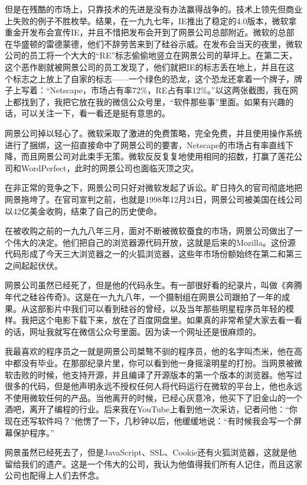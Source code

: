 \documentclass[
  letterpaper,
  DIV=11,
  numbers=noendperiod]{scrreprt}
\begin{document}
但是在残酷的市场上，只靠技术的先进是没有办法赢得战争的。技术上领先但商业上失败的例子不胜枚举。结果，在一九九七年，IE推出了稳定的4.0版本，微软拿重金开发布会宣传IE，并且不惜把发布会开到了网景公司总部附近。微软的总部在华盛顿的雷德蒙德，他们不辞劳苦来到了硅谷示威。在发布会当天的夜里，微软公司的员工将一个大大的``RE''标志偷偷地竖立在网景公司的草坪上。在第二天，这个恶作剧就被网景公司的员工发现了，他们就把IE的标志丢在地上，并且在这个标志之上放上了自家的标志------一个绿色的恐龙，这个恐龙还拿着一个牌子，牌子上写着：``Netscape，市场占有率72\%，RE占有率12\%。''以这两张截图，我在网上都找到了，我把它放在我的微信公众号里，``软件那些事''里面。如果有兴趣的话，可以关注一下，看一看还是挺有意思的。

网景公司掉以轻心了。微软采取了激进的免费策略，完全免费，并且使用操作系统进行了捆绑，这一招直接命中了网景公司的要害，Netscape的市场占有率直线下降，而且网景公司对此束手无策。微软反反复复地使用相同的招数，打赢了莲花公司和WordPerfect，此时的网景公司也面临灭顶之灾。

在非正常的竞争之下，网景公司只好对微软发起了诉讼。旷日持久的官司彻底地把网景拖垮了。在官司宣判之前，也就是1998年12月24日，网景公司被美国在线公司以42亿美金收购，结束了自己的历史使命。

在被收购之前的一九九八年三月，面对不断被微软蚕食的市场，网景公司做出了一个伟大的决定。他们把自己的浏览器源代码开放，这就是后来的Mozilla。这份源代码形成了今天三大浏览器之一的火狐浏览器，这些年市场份额始终在第二和第三之间起起伏伏。

网景公司虽然已经死了，但是他的代码永生。有一部很好看的纪录片，叫做《奔腾年代之硅谷传奇》。这是在一九九八年，一个摄制组在网景公司跟拍了一年的成果。从这部影片中我们可以看到硅谷的曾经，以及当年那些明星程序员年轻的模样。我把这个电影下载下来，放在了百度网盘里。如果真的非常希望大家去看一看的话，网址我就写在微信公众号里面。因为读一个网址还是很麻烦的。

我最喜欢的程序员之一就是网景公司桀骜不驯的程序员，他的名字叫杰米，他在高中都没有毕业。在那部纪录片里，你可以看到他一身摇滚明星的打扮。当网景被微软击败的时候，他支持开源，并且编译了开源版本的第一个版本的浏览器。他写过很多的代码，但是他声明永远不授权任何人将代码运行在微软的平台上，他也永远不使用微软任何的产品。当他离开的时候，已经心灰意冷，他买下了旧金山的一个酒吧，离开了编程的行业。后来我在YouTube上看到他一次采访，记者问他：``你现在还写软件吗？''他愣了一下，几秒钟以后，他缓缓地说：``有时候我会写一个屏幕保护程序。''

网景虽然已经死去了，但是JavaScript、SSL、Cookie还有火狐浏览器，这就是他留给我们的遗产。这是一个伟大的公司，我认为他值得我们所有人记住，而且这家公司也配得上人们去怀念。
\end{document}
